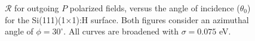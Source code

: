 \begin{figure}[H]
\centering
{}\hfill
{}
    \caption{$\mathcal{R}$ for outgoing $P$ polarized fields, versus the angle
    of incidence ($\theta_{0}$) for the Si(111)(1$\times$1):H surface. Both
    figures consider an azimuthal angle of $\phi = 30^{\circ}$. All curves are
    broadened with $\sigma = 0.075$ eV.}
\label{fig:1x1rP3d}
\end{figure}

